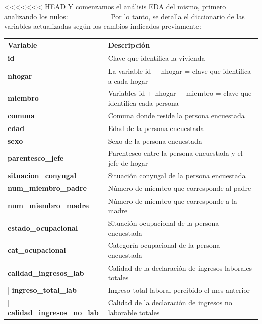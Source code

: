 \documentclass[a4paper]{article}
\begin{document}
<<<<<<< HEAD
    Y comenzamos el análisis EDA del mismo, primero analizando los nulos:
=======
    Por lo tanto, se detalla el diccionario de las variables actualizadas según los cambios indicados previamente:
    \begin{table}[H]
    \begin{tabular}{ll}
        \toprule
        \textbf{Variable}                     & \textbf{Descripción} \\ \midrule
        \textbf{id}                            & Clave que identifica la vivienda \\                            
        \textbf{nhogar}                        & La variable id + nhogar = clave que identifica a cada hogar \\ 
        \textbf{miembro}                       & Variables id + nhogar + miembro = clave que identifica  cada persona \\ 
        \textbf{comuna}                        & Comuna donde reside la persona encuestada \\ 
        \textbf{edad}                          & Edad de la persona encuestada \\             
        \textbf{sexo}                          & Sexo de la persona encuestada \\             
        \textbf{parentesco\_jefe}              & Parentesco entre la persona encuestada y el jefe de hogar \\ 
        \textbf{situacion\_conyugal}           & Situación conyugal de la persona encuestada \\               
        \textbf{num\_miembro\_padre}           & Número de miembro que corresponde al padre \\                
        \textbf{num\_miembro\_madre}           & Número de miembro que corresponde a la madre \\   
        \textbf{estado\_ocupacional}           & Situación ocupacional de la persona encuestada \\ 
        \textbf{cat\_ocupacional}              & Categoría ocupacional de la persona encuestada \\ 
        \textbf{calidad\_ingresos\_lab}        & Calidad de la declaración de ingresos laborales totales \\ |
        \textbf{ingreso\_total\_lab}           & Ingreso total laboral percibido el mes anterior \\         |
        \textbf{calidad\_ingresos\_no\_lab}    & Calidad de la declaración de ingresos no laborable totales \\

\end{tabular}
\end{table}
\end{document}
